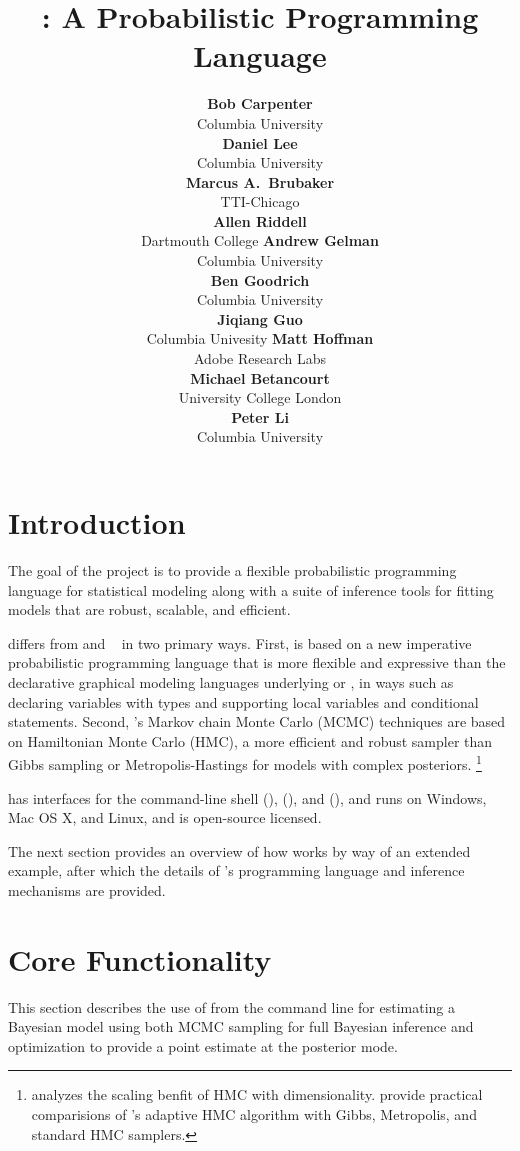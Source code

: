 \documentclass[article]{jss}
\author{{\bf\large Bob Carpenter}
        \\ Columbia University
        \\[9pt]
        {\bf\large Daniel Lee}
        \\ Columbia University
        \\[9pt]
        {\bf\large Marcus A.\ Brubaker}
        \\ TTI-Chicago
        \\[9pt]
        {\bf\large Allen Riddell}
        \\ Dartmouth College
    \And
        {\bf\large Andrew Gelman}
        \\ Columbia University
        \\[9pt]
        {\bf\large Ben Goodrich}
        \\ Columbia University
        \\[9pt]
        {\bf\large Jiqiang Guo}
        \\ Columbia Univesity
     \And
        {\bf\large Matt Hoffman}
        \\ Adobe Research Labs
        \\[9pt]
        {\bf\large Michael Betancourt}
        \\ University College London
        \\[9pt]
        {\bf\large Peter Li}
        \\ Columbia University
        \\[9pt]
}
\title{\proglang{Stan}: A Probabilistic Programming Language}
\begin{document}

\section[Introduction]{Introduction}

The goal of the  project is to provide a flexible
probabilistic programming language for statistical modeling along with
a suite of inference tools for fitting models that are robust,
scalable, and efficient.

 differs from 
\citep{LunnEtAl:2000,LunnEtAl:2009,LunnEtAl:2012} and
~\citep{Plummer:2003} in two primary ways.  First,
 is based on a new imperative probabilistic programming
language that is more flexible and expressive than the declarative
graphical modeling languages underlying  or
, in ways such as declaring variables with types and
supporting local variables and conditional statements.  Second,
's Markov chain Monte Carlo (MCMC) techniques are based
on Hamiltonian Monte Carlo (HMC), a more efficient and robust sampler
than Gibbs sampling or Metropolis-Hastings for models with complex
posteriors.%
%
\footnote{\cite{Neal:2011} analyzes the scaling benfit of HMC with
  dimensionality.  \cite{Hoffman-Gelman:2014} provide practical
  comparisions of 's adaptive HMC algorithm with Gibbs,
  Metropolis, and standard HMC samplers.}

 has interfaces for the command-line shell
(),  (), and 
(), and runs on Windows, Mac OS X, and Linux, and is
open-source licensed.

The next section provides an overview of how  works by
way of an extended example, after which the details of 's
programming language and inference mechanisms are provided.



\section{Core Functionality}\label{example.section}

This section describes the use of  from the command
line for estimating a Bayesian model using both MCMC sampling for full
Bayesian inference and optimization to provide a point estimate at the
posterior mode.
\end{document}
